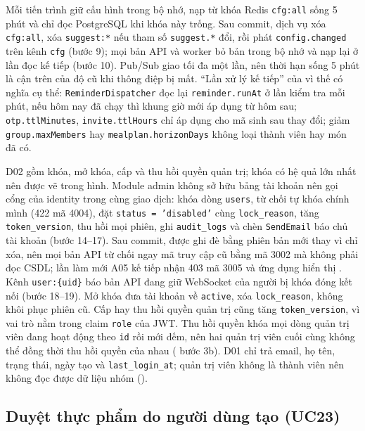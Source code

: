 Mỗi tiến trình giữ cấu hình trong bộ nhớ, nạp từ khóa Redis \texttt{cfg:all} sống 5 phút và chỉ đọc PostgreSQL khi khóa này trống. Sau commit, dịch vụ xóa \texttt{cfg:all}, xóa \texttt{suggest:*} nếu tham số \texttt{suggest.*} đổi, rồi phát \texttt{config.changed} trên kênh \texttt{cfg} (bước 9); mọi bản API và worker bỏ bản trong bộ nhớ và nạp lại ở lần đọc kế tiếp (bước 10). Pub/Sub giao tối đa một lần, nên thời hạn sống 5 phút là cận trên của độ cũ khi thông điệp bị mất. “Lần xử lý kế tiếp” của  vì thế có nghĩa cụ thể: \texttt{ReminderDispatcher} đọc lại \texttt{reminder.runAt} ở lần kiểm tra mỗi phút, nếu hôm nay đã chạy thì khung giờ mới áp dụng từ hôm sau; \texttt{otp.ttlMinutes}, \texttt{invite.ttlHours} chỉ áp dụng cho mã sinh sau thay đổi; giảm \texttt{group.maxMembers} hay \texttt{mealplan.horizonDays} không loại thành viên hay món đã có.

D02 gồm khóa, mở khóa, cấp và thu hồi quyền quản trị; khóa có hệ quả lớn nhất nên được vẽ trong hình. Module admin không sở hữu bảng tài khoản nên gọi cổng của identity trong cùng giao dịch: khóa dòng \texttt{users}, từ chối tự khóa chính mình (422 mã 4004), đặt \texttt{status = 'disabled'} cùng \texttt{lock\_reason}, tăng \texttt{token\_version}, thu hồi mọi phiên, ghi \texttt{audit\_logs} và chèn \texttt{SendEmail} báo chủ tài khoản (bước 14--17). Sau commit,  được ghi đè bằng phiên bản mới thay vì chỉ xóa, nên mọi bản API từ chối ngay mã truy cập cũ bằng mã 3002 mà không phải đọc CSDL; lần làm mới A05 kế tiếp nhận 403 mã 3005 và ứng dụng hiển thị . Kênh \texttt{user:\{uid\}} báo bản API đang giữ WebSocket của người bị khóa đóng kết nối (bước 18--19). Mở khóa đưa tài khoản về \texttt{active}, xóa \texttt{lock\_reason}, không khôi phục phiên cũ. Cấp hay thu hồi quyền quản trị cũng tăng \texttt{token\_version}, vì vai trò nằm trong claim \texttt{role} của JWT. Thu hồi quyền khóa mọi dòng quản trị viên đang hoạt động theo \texttt{id} rồi mới đếm, nên hai quản trị viên cuối cùng không thể đồng thời thu hồi quyền của nhau ( bước 3b). D01 chỉ trả email, họ tên, trạng thái, ngày tạo và \texttt{last\_login\_at}; quản trị viên không là thành viên nên không đọc được dữ liệu nhóm ().

\subsection{Duyệt thực phẩm do người dùng tạo (UC23)}\label{sssec:ht-duyet-thuc-pham}

